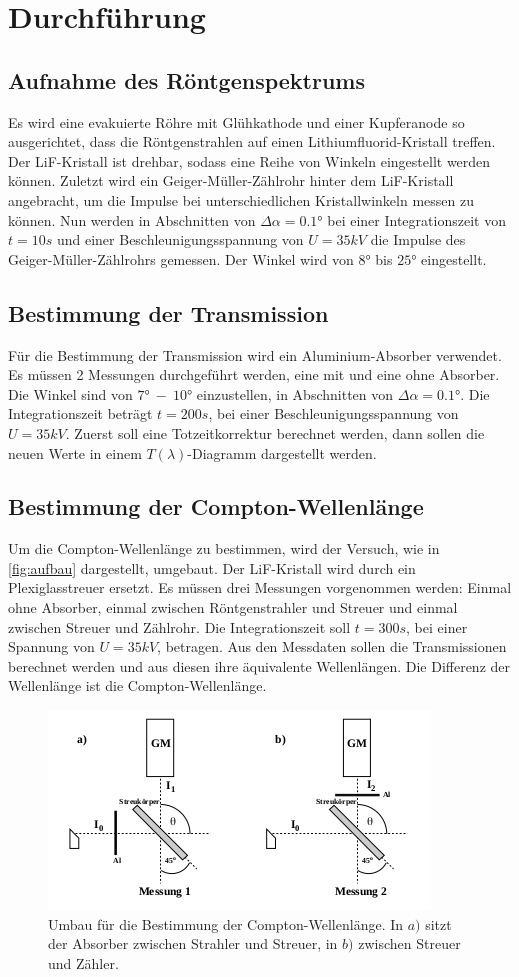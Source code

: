 \section{Durchführung}
\label{sec:Durchführung}

\subsection{Aufnahme des Röntgenspektrums}

Es wird eine evakuierte Röhre mit Glühkathode und einer Kupferanode so ausgerichtet, dass die Röntgenstrahlen auf einen Lithiumfluorid-Kristall treffen.
Der LiF-Kristall ist drehbar, sodass eine Reihe von Winkeln eingestellt werden können.
Zuletzt wird ein Geiger-Müller-Zählrohr hinter dem LiF-Kristall angebracht, um die Impulse bei unterschiedlichen Kristallwinkeln messen zu können.
Nun werden in Abschnitten von $\Delta \alpha = 0.1°$ bei einer Integrationszeit von $t = 10s$ und einer Beschleunigungsspannung von $U = 35kV$ die Impulse des Geiger-Müller-Zählrohrs gemessen.
Der Winkel wird von $8°$ bis $25°$ eingestellt.

\subsection{Bestimmung der Transmission}

Für die Bestimmung der Transmission wird ein Aluminium-Absorber verwendet.
Es müssen 2 Messungen durchgeführt werden, eine mit und eine ohne Absorber.
Die Winkel sind von $7°\ -\ 10°$ einzustellen, in Abschnitten von $\Delta \alpha = 0.1°$.
Die Integrationszeit beträgt $t = 200s$, bei einer Beschleunigungsspannung von $U = 35kV$.
Zuerst soll eine Totzeitkorrektur berechnet werden, dann sollen die neuen Werte in einem $T(\lambda)$-Diagramm dargestellt werden.

\subsection{Bestimmung der Compton-Wellenlänge}

Um die Compton-Wellenlänge zu bestimmen, wird der Versuch, wie in \autoref{fig:aufbau} dargestellt, umgebaut.
Der LiF-Kristall wird durch ein Plexiglasstreuer ersetzt.
Es müssen drei Messungen vorgenommen werden: Einmal ohne Absorber, einmal zwischen Röntgenstrahler und Streuer und einmal zwischen Streuer und Zählrohr.
Die Integrationszeit soll $t = 300s$, bei einer Spannung von $U = 35kV$, betragen.
Aus den Messdaten sollen die Transmissionen berechnet werden und aus diesen ihre äquivalente Wellenlängen.
Die Differenz der Wellenlänge ist die Compton-Wellenlänge.

\begin{figure}[htbp]
    \centering
    \includegraphics{content/Aufbau_Compton.png}
    \caption{Umbau für die Bestimmung der Compton-Wellenlänge. In $a)$ sitzt der Absorber zwischen Strahler und Streuer, in $b)$ zwischen Streuer und Zähler.}
    \label{fig:aufbau}
\end{figure}